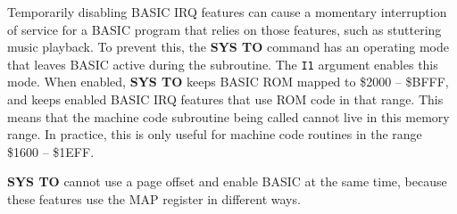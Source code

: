 Temporarily disabling BASIC IRQ features can cause a momentary interruption of service for a BASIC program that relies on those features, such as stuttering music playback. To prevent this, the {\bf SYS TO} command has an operating mode that leaves BASIC active during the subroutine. The \texttt{I1} argument enables this mode. When enabled, {\bf SYS TO} keeps BASIC ROM mapped to \$2000 -- \$BFFF, and keeps enabled BASIC IRQ features that use ROM code in that range. This means that the machine code subroutine being called cannot live in this memory range. In practice, this is only useful for machine code routines in the range \$1600 -- \$1EFF.


{\bf SYS TO} cannot use a page offset and enable BASIC at the same time, because these features use the MAP register in different ways.